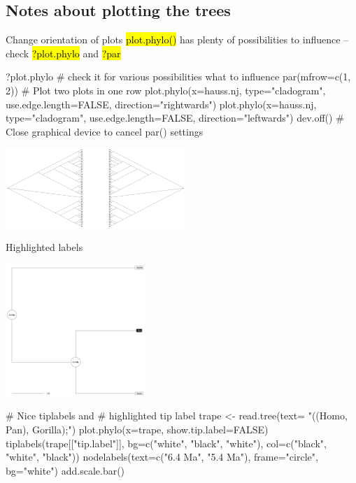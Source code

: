 \documentclass[compress, ucs, xelatex, 11pt, xcolor=svgnames,
  hyperref={
    bookmarks=true,
    unicode=true,
    colorlinks=true,
    pdftitle={Molecular data in R},
    plainpages=false,
    pdfauthor={Vojtech Zeisek},
    pdfsubject={Course about phylogeny and evolution in R},
    pdfcreator={XeLaTeX},
    pdfkeywords={R, evolution, phylogeny, molecular data},
    linkcolor=Tomato,
    anchorcolor=SaddleBrown,
    citecolor=Goldenrod,
    filecolor=DarkMagenta,
    menucolor=Sienna,
    urlcolor=DarkTurquoise,
    pdftex},
  url={hyphens, lowtilde} %
  ]{beamer}
\renewcommand{\texttt}[1]{\hl{\ttfamily #1}}
\begin{document}
\subsection{Notes about plotting the trees}

\begin{frame}[fragile]{Change orientation of plots}
\texttt{plot.phylo()} has plenty of possibilities to influence -- check \texttt{?plot.phylo} and \texttt{?par}
  \begin{spluscode}
    ?plot.phylo # check it for various possibilities what to influence
    par(mfrow=c(1, 2)) # Plot two plots in one row
    plot.phylo(x=hauss.nj, type="cladogram", use.edge.length=FALSE,
      direction="rightwards")
    plot.phylo(x=hauss.nj, type="cladogram", use.edge.length=FALSE,
      direction="leftwards")
    dev.off() # Close graphical device to cancel par() settings
  \end{spluscode}
\begin{center}
  \includegraphics[height=3cm]{lr.png}
\end{center}
\end{frame}

\begin{frame}[fragile]{Highlighted labels}
\begin{multicols}{2}
  \includegraphics[height=5cm]{highlight.png}
  \columnbreak
  \begin{spluscode}
    # Nice tiplabels and
    # highlighted tip label
    trape <- read.tree(text=
      "((Homo, Pan), Gorilla);")
    plot.phylo(x=trape,
      show.tip.label=FALSE)
    tiplabels(trape[["tip.label"]],
      bg=c("white", "black",
      "white"), col=c("black",
      "white", "black"))
    nodelabels(text=c("6.4 Ma",
      "5.4 Ma"), frame="circle",
      bg="white")
    add.scale.bar()
  \end{spluscode}
\end{multicols}
\end{frame}
\end{document}
